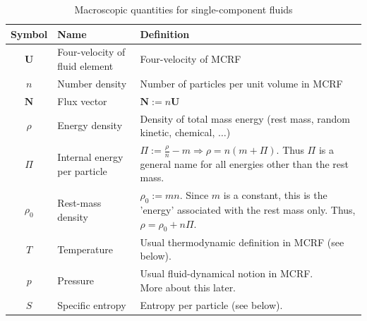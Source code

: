 \documentclass[11pt,letterpaper]{book}
\begin{document}
    \begin{table}[h]
    \centering
    \begin{tabular}{|c|l|l|}
    \hline
    \textbf{Symbol} & \textbf{Name} & \textbf{Definition} \\ \hline
    \(\mathbf{U}\) & \footnotesize Four-velocity of fluid element &\footnotesize Four-velocity of MCRF\par \\ \hline
    \(n\) & \footnotesize Number density &\footnotesize Number of particles per unit volume in MCRF \par \\ \hline
    \(\mathbf{N}\) &\footnotesize Flux vector &\footnotesize \(\mathbf{N} := n\mathbf{U}\) \\ \hline
    \(\rho\) &\footnotesize Energy density & \thead{\footnotesize Density of total mass energy \\(rest mass, random kinetic, chemical, $\dots$)}\\ \hline
    \(\Pi\) &\footnotesize Internal energy per particle &\thead{\footnotesize \(\Pi := \frac{\rho}{n} - m \Rightarrow \rho = n(m + \Pi)\). \\ Thus \(\Pi\) is a general name for all energies \\other than the rest mass.}\\ \hline
    \(\rho_0\) &\footnotesize Rest-mass density &\thead{\footnotesize \(\rho_0 := mn\). Since \(m\) is a constant,\\ this is the 'energy' associated with the rest mass only. \\Thus, \(\rho = \rho_0 + n\Pi\).}\\ \hline
    \(T\) &\footnotesize Temperature &\footnotesize Usual thermodynamic definition in MCRF (see below). \\ \hline
    \(p\) &\footnotesize Pressure & \thead{\footnotesize Usual fluid-dynamical notion in MCRF. \\More about this later.} \\ \hline
    \(S\) &\footnotesize Specific entropy &\footnotesize Entropy per particle (see below). \\ \hline
    \end{tabular}
    \caption{Macroscopic quantities for single-component fluids}
    \label{table 4.1}
    \end{table}
\end{document}
